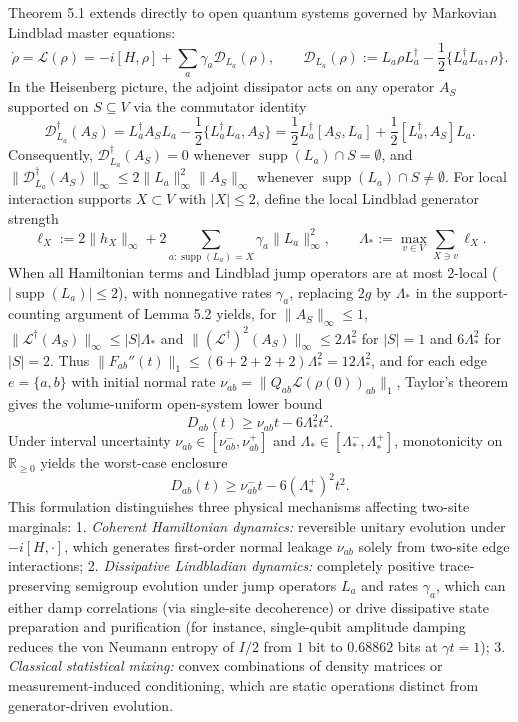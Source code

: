 \documentclass[
  11pt,
]{article}
\begin{document}
Theorem 5.1 extends directly to open quantum systems governed by Markovian Lindblad master equations:
\[
\dot\rho = \mathcal L(\rho) = -i[H, \rho] + \sum_a \gamma_a \mathcal{D}_{L_a}(\rho), \qquad \mathcal{D}_{L_a}(\rho) := L_a \rho L_a^\dagger - \frac{1}{2} \{L_a^\dagger L_a, \rho\}.
\]
In the Heisenberg picture, the adjoint dissipator acts on any operator \(A_S\) supported on \(S\subseteq V\) via the commutator identity
\[
\mathcal{D}_{L_a}^\dagger(A_S) = L_a^\dagger A_S L_a - \frac{1}{2}\{L_a^\dagger L_a, A_S\} = \frac{1}{2}L_a^\dagger[A_S, L_a] + \frac{1}{2}[L_a^\dagger, A_S]L_a.
\]
Consequently, \(\mathcal{D}_{L_a}^\dagger(A_S) = 0\) whenever \(\operatorname{supp}(L_a)\cap S = \emptyset\), and \(\lVert\mathcal{D}_{L_a}^\dagger(A_S)\rVert_\infty \le 2\lVert L_a\rVert_\infty^2 \lVert A_S\rVert_\infty\) whenever \(\operatorname{supp}(L_a)\cap S \ne \emptyset\). For local interaction supports \(X\subset V\) with \(|X|\le 2\), define the local Lindblad generator strength
\[
\ell_X := 2\lVert h_X\rVert_\infty + 2\sum_{a: \operatorname{supp}(L_a) = X} \gamma_a \lVert L_a\rVert_\infty^2, \qquad \Lambda_* := \max_{v\in V} \sum_{X\ni v} \ell_X.
\]
When all Hamiltonian terms and Lindblad jump operators are at most 2-local (\(\lvert\operatorname{supp}(L_a)\rvert \le 2\)), with nonnegative rates \(\gamma_a\), replacing \(2g\) by \(\Lambda_*\) in the support-counting argument of Lemma 5.2 yields, for \(\lVert A_S\rVert_\infty\le1\), \(\lVert\mathcal{L}^\dagger(A_S)\rVert_\infty \le |S|\Lambda_*\) and \(\lVert(\mathcal{L}^\dagger)^2(A_S)\rVert_\infty \le 2\Lambda_*^2\) for \(|S|=1\) and \(6\Lambda_*^2\) for \(|S|=2\). Thus \(\lVert F_{ab}''(t)\rVert_1 \le (6 + 2 + 2 + 2)\Lambda_*^2 = 12\Lambda_*^2\), and for each edge \(e=\{a,b\}\) with initial normal rate \(\nu_{ab} = \lVert Q_{ab}\mathcal{L}(\rho(0))_{ab}\rVert_1\), Taylor's theorem gives the volume-uniform open-system lower bound
\[
D_{ab}(t) \ge \nu_{ab} t - 6\Lambda_*^2 t^2.
\]
Under interval uncertainty \(\nu_{ab} \in [\nu_{ab}^-, \nu_{ab}^+]\) and \(\Lambda_* \in [\Lambda_*^-, \Lambda_*^+]\), monotonicity on \(\mathbb{R}_{\ge 0}\) yields the worst-case enclosure
\[
D_{ab}(t) \ge \nu_{ab}^- t - 6(\Lambda_*^+)^2 t^2.
\]
This formulation distinguishes three physical mechanisms affecting two-site marginals:
1. \emph{Coherent Hamiltonian dynamics:} reversible unitary evolution under \(-i[H, \cdot]\), which generates first-order normal leakage \(\nu_{ab}\) solely from two-site edge interactions;
2. \emph{Dissipative Lindbladian dynamics:} completely positive trace-preserving semigroup evolution under jump operators \(L_a\) and rates \(\gamma_a\), which can either damp correlations (via single-site decoherence) or drive dissipative state preparation and purification (for instance, single-qubit amplitude damping reduces the von Neumann entropy of \(I/2\) from \(1\) bit to \(0.68862\) bits at \(\gamma t = 1\));
3. \emph{Classical statistical mixing:} convex combinations of density matrices or measurement-induced conditioning, which are static operations distinct from generator-driven evolution.
\end{document}
